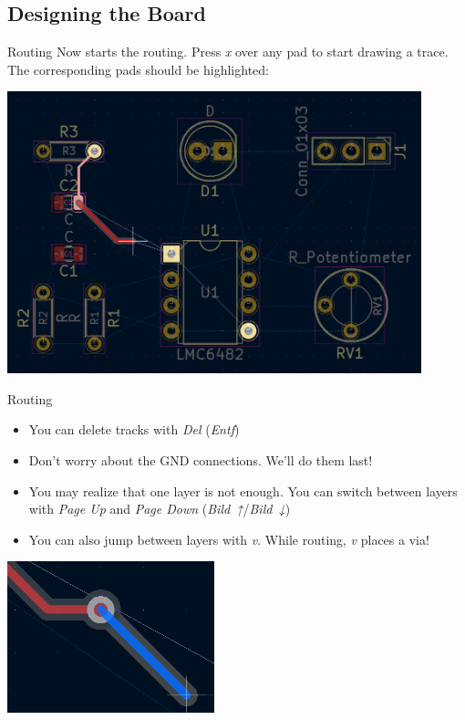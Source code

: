 \documentclass{beamer}
\begin{document}
\subsection{Designing the Board}

\begin{frame}{Routing}
  Now starts the routing. Press \textit{x} over any pad to start drawing a trace. The corresponding pads should be highlighted:
  \begin{center}
    \includegraphics[width=0.9\textwidth]{images/routing.png} 
  \end{center}
\end{frame}

\begin{frame}{Routing}
  \begin{itemize}
    \item You can delete tracks with \textit{Del} (\textit{Entf})
    \item Don't worry about the GND connections. We'll do them last!
    \item You may realize that one layer is not enough. You can switch between layers with \textit{Page Up} and \textit{Page Down} (\textit{Bild~↑}/\textit{Bild~↓})
    \item You can also jump between layers with \textit{v}. While routing, \textit{v} places a via!
  \end{itemize}
  \begin{center}
    \includegraphics[width=0.45\textwidth]{images/placing-via.png}
  \end{center}
\end{frame}
\end{document}

